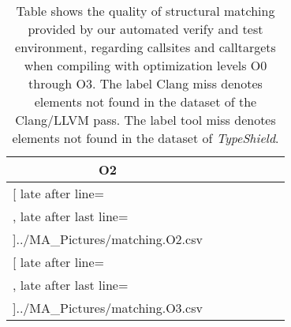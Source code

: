 \begin{table}
{\begin{tabular}{l|c|c|c|c|c|c}
	\multicolumn{1}{c}{\bfseries O2}%
	\\\midrule
	\csvreader[ late after line=\\, late after last line=\\\midrule]{../MA_Pictures/matching.O2.csv}{
	}
	{\csvcoli & \csvcoliii & \csvcoliv & \csvcolv & \csvcolix & \csvcolx & \csvcolxi }%
%
%

	\multicolumn{1}{c}{\bfseries O3 }%
	\\\midrule
	\csvreader[ late after line=\\, late after last line=\\\bottomrule]{../MA_Pictures/matching.O3.csv}{
	}
	{\csvcoli & \csvcoliii & \csvcoliv & \csvcolv & \csvcolix & \csvcolx & \csvcolxi }%
    	\end{tabular}
}
		\caption {Table shows the quality of structural matching provided by our automated verify and test environment, regarding callsites and calltargets when compiling with optimization levels O0 through O3. The label Clang miss denotes elements not found in the dataset of the Clang/LLVM pass. The label tool miss denotes elements not found in the dataset of \textit{TypeShield}.}
	\label{tbl:matchingquality}
\end{table}



